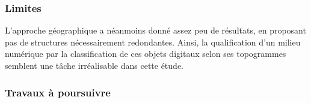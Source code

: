 \subsubsection[Limites]{Limites} 

L{\textquoteright}approche géographique a néanmoins donné assez peu de résultats, en proposant pas de structures nécessairement redondantes. Ainsi, la qualification d{\textquoteright}un milieu numérique par la classification de ces objets digitaux selon ses topogrammes semblent une t\^ache irréalisable dans cette étude. 





\subsubsection[Travaux à poursuivre]{Travaux à poursuivre} 


